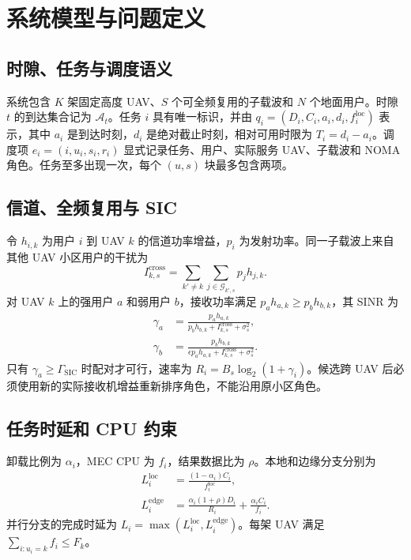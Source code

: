 \chapter{系统模型与问题定义}
\section{时隙、任务与调度语义}
系统包含 $K$ 架固定高度 UAV、$S$ 个可全频复用的子载波和 $N$ 个地面用户。时隙 $t$ 的到达集合记为 $\mathcal A_t$。任务 $i$ 具有唯一标识，并由
$q_i=(D_i,C_i,a_i,d_i,f_i^{\mathrm{loc}})$ 表示，其中 $a_i$ 是到达时刻，$d_i$ 是绝对截止时刻，相对可用时限为 $T_i=d_i-a_i$。调度项
$e_i=(i,u_i,s_i,r_i)$ 显式记录任务、用户、实际服务 UAV、子载波和 NOMA 角色。任务至多出现一次，每个 $(u,s)$ 块最多包含两项。

\section{信道、全频复用与 SIC}
令 $h_{i,k}$ 为用户 $i$ 到 UAV $k$ 的信道功率增益，$p_i$ 为发射功率。同一子载波上来自其他 UAV 小区用户的干扰为
\begin{equation}
I_{k,s}^{\mathrm{cross}}=\sum_{k'\ne k}\sum_{j\in\mathcal G_{k',s}}p_jh_{j,k}.
\end{equation}
对 UAV $k$ 上的强用户 $a$ 和弱用户 $b$，接收功率满足
$p_ah_{a,k}\ge p_bh_{b,k}$，其 SINR 为
\begin{align}
\gamma_a&=\frac{p_ah_{a,k}}{p_bh_{b,k}+I_{k,s}^{\mathrm{cross}}+\sigma_s^2},\\
\gamma_b&=\frac{p_bh_{b,k}}{\epsilon p_ah_{a,k}+I_{k,s}^{\mathrm{cross}}+\sigma_s^2}.
\end{align}
只有 $\gamma_a\ge\Gamma_{\mathrm{SIC}}$ 时配对才可行，速率为
$R_i=B_s\log_2(1+\gamma_i)$。候选跨 UAV 后必须使用新的实际接收机增益重新排序角色，不能沿用原小区角色。

\section{任务时延和 CPU 约束}
卸载比例为 $\alpha_i$，MEC CPU 为 $f_i$，结果数据比为 $\rho$。本地和边缘分支分别为
\begin{align}
L_i^{\mathrm{loc}}&=\frac{(1-\alpha_i)C_i}{f_i^{\mathrm{loc}}},\\
L_i^{\mathrm{edge}}&=\frac{\alpha_i(1+\rho)D_i}{R_i}+\frac{\alpha_iC_i}{f_i}.
\end{align}
并行分支的完成时延为 $L_i=\max(L_i^{\mathrm{loc}},L_i^{\mathrm{edge}})$。每架 UAV 满足 $\sum_{i:u_i=k}f_i\le F_k$。

